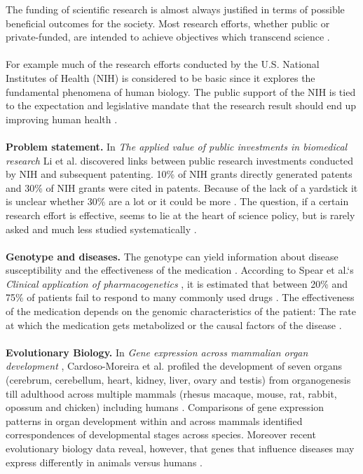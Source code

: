 \documentclass[11pt,titlepage,oneside,openany]{book}
\begin{document}
The funding of scientific research is almost always justified in terms of possible beneficial outcomes for the society. Most research efforts, whether public or private-funded, are intended to achieve objectives which transcend science \cite{Sarewitz2007TheNH}.
\\
\\
For example much of the research efforts conducted by the U.S. National Institutes of Health (NIH) is considered to be basic since it explores the fundamental phenomena of human biology. The public support of the NIH is tied to the expectation and legislative mandate that the research result should end up improving human health \cite{Sarewitz2007TheNH}. 
\\
\\
\textbf{Problem statement.} In \textit{The applied value of public investments in biomedical research}\cite{Li2017TheAV} Li et al. discovered links between public research investments conducted by NIH and subsequent patenting. 10\% of NIH grants directly generated patents and 30\% of NIH grants were cited in patents. Because of the lack of a yardstick it is unclear whether 30\% are a lot or it could be more \cite{Li2017TheAV}. The question, if a certain research effort is effective, seems to lie at the heart of science policy, but is rarely asked and much less studied systematically \cite{Sarewitz2007TheNH}.
\\
\\
\textbf{Genotype and diseases.} The genotype can yield information about disease susceptibility and the effectiveness of the medication \cite{Brunicardi2011OverviewOT}. According to Spear et al.`s \textit{Clinical application of pharmacogenetics} \cite{Spear2001ClinicalAO}, it is estimated that between 20\% and 75\% of patients fail to respond to many commonly used drugs \cite{Spear2001ClinicalAO}. The effectiveness of the medication depends on the genomic characteristics of the patient: The rate at which the medication gets metabolized or the causal factors of the disease \cite{Brunicardi2011OverviewOT}.
\\
\\
\textbf{Evolutionary Biology.} In \textit{Gene expression across mammalian organ development} \cite{CardosoMoreira2019GeneEA}, Cardoso-Moreira et al. profiled the development of seven organs (cerebrum, cerebellum, heart, kidney, liver, ovary and testis) from organogenesis till adulthood across multiple mammals (rhesus macaque, mouse, rat, rabbit, opossum and chicken) including humans \cite{CardosoMoreira2019GeneEA}. Comparisons of gene expression patterns in organ development within and across mammals identified correspondences of developmental stages across species. Moreover recent evolutionary biology data reveal, however, that genes that influence diseases may express differently in animals versus humans \cite{CardosoMoreira2019GeneEA}.
\end{document}

